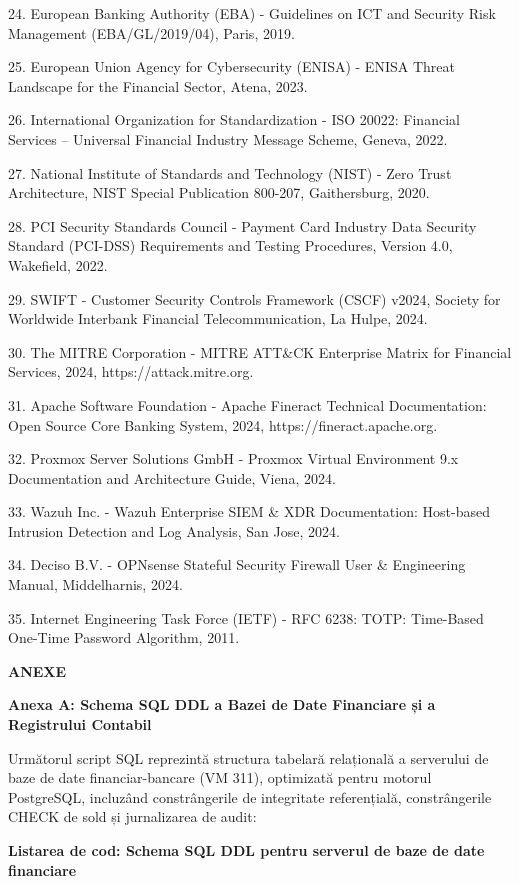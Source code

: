 \documentclass[
]{article}
\begin{document}
24. European Banking Authority (EBA) - Guidelines on ICT and Security
Risk Management (EBA/GL/2019/04), Paris, 2019.

25. European Union Agency for Cybersecurity (ENISA) - ENISA Threat
Landscape for the Financial Sector, Atena, 2023.

26. International Organization for Standardization - ISO 20022:
Financial Services -- Universal Financial Industry Message Scheme,
Geneva, 2022.

27. National Institute of Standards and Technology (NIST) - Zero Trust
Architecture, NIST Special Publication 800-207, Gaithersburg, 2020.

28. PCI Security Standards Council - Payment Card Industry Data Security
Standard (PCI-DSS) Requirements and Testing Procedures, Version 4.0,
Wakefield, 2022.

29. SWIFT - Customer Security Controls Framework (CSCF) v2024, Society
for Worldwide Interbank Financial Telecommunication, La Hulpe, 2024.

30. The MITRE Corporation - MITRE ATT\&CK Enterprise Matrix for
Financial Services, 2024, https://attack.mitre.org.

31. Apache Software Foundation - Apache Fineract Technical
Documentation: Open Source Core Banking System, 2024,
https://fineract.apache.org.

32. Proxmox Server Solutions GmbH - Proxmox Virtual Environment 9.x
Documentation and Architecture Guide, Viena, 2024.

33. Wazuh Inc. - Wazuh Enterprise SIEM \& XDR Documentation: Host-based
Intrusion Detection and Log Analysis, San Jose, 2024.

34. Deciso B.V. - OPNsense Stateful Security Firewall User \&
Engineering Manual, Middelharnis, 2024.

35. Internet Engineering Task Force (IETF) - RFC 6238: TOTP: Time-Based
One-Time Password Algorithm, 2011.

\textbf{ANEXE}

\textbf{Anexa A: Schema SQL DDL a Bazei de Date Financiare și a
Registrului Contabil}

Următorul script SQL reprezintă structura tabelară relațională a
serverului de baze de date financiar-bancare (VM 311), optimizată pentru
motorul PostgreSQL, incluzând constrângerile de integritate
referențială, constrângerile CHECK de sold și jurnalizarea de audit:

\textbf{Listarea de cod: Schema SQL DDL pentru serverul de baze de date
financiare}
\end{document}
